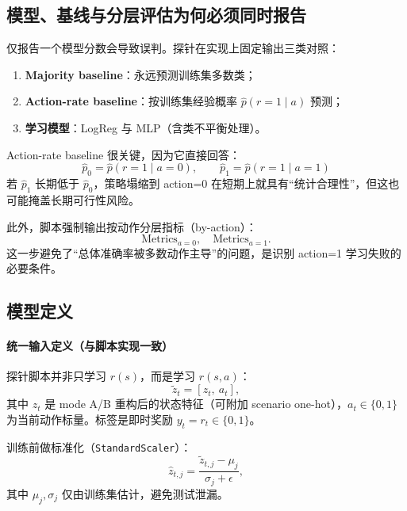 ﻿\documentclass[11pt,a4paper]{ctexart}
\begin{document}
\subsection{模型、基线与分层评估为何必须同时报告}
仅报告一个模型分数会导致误判。探针在实现上固定输出三类对照：
\begin{enumerate}[leftmargin=*]
  \item \textbf{Majority baseline}：永远预测训练集多数类；
  \item \textbf{Action-rate baseline}：按训练集经验概率
  \(
  \hat p(r=1\mid a)
  \)
  预测；
  \item \textbf{学习模型}：LogReg 与 MLP（含类不平衡处理）。
\end{enumerate}
Action-rate baseline 很关键，因为它直接回答：
\begin{equation}
\hat p_0=\hat p(r=1\mid a=0),\qquad
\hat p_1=\hat p(r=1\mid a=1)
\end{equation}
若 \(\hat p_1\) 长期低于 \(\hat p_0\)，策略塌缩到 action=0 在短期上就具有“统计合理性”，但这也可能掩盖长期可行性风险。

此外，脚本强制输出按动作分层指标（by-action）：
\begin{equation}
\text{Metrics}_{a=0},\quad \text{Metrics}_{a=1}.
\end{equation}
这一步避免了“总体准确率被多数动作主导”的问题，是识别 action=1 学习失败的必要条件。

\subsection{模型定义}
\paragraph{统一输入定义（与脚本实现一致）}
探针脚本并非只学习 \(r(s)\)，而是学习 \(r(s,a)\)：
\begin{equation}
\tilde z_t=[z_t,\ a_t],
\end{equation}
其中 \(z_t\) 是 mode A/B 重构后的状态特征（可附加 scenario one-hot），\(a_t\in\{0,1\}\) 为当前动作标量。标签是即时奖励
\(y_t=r_t\in\{0,1\}\)。

训练前做标准化（\texttt{StandardScaler}）：
\begin{equation}
\hat z_{t,j}=\frac{\tilde z_{t,j}-\mu_j}{\sigma_j+\epsilon},
\end{equation}
其中 \(\mu_j,\sigma_j\) 仅由训练集估计，避免测试泄漏。
\end{document}
